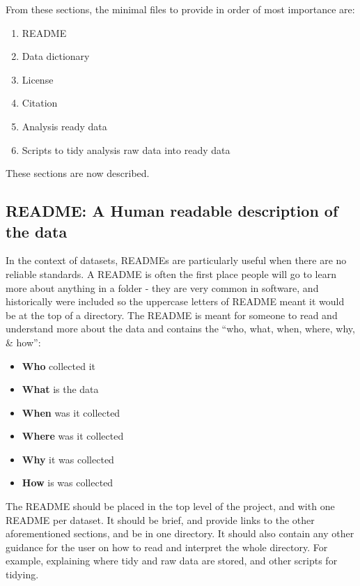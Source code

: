 \documentclass[
]{article}
\providecommand{\tightlist}{%
  \setlength{\itemsep}{0pt}\setlength{\parskip}{0pt}}
\begin{document}
From these sections, the minimal files to provide in order of most importance are:

\begin{enumerate}
\def\labelenumi{\arabic{enumi}.}
\tightlist
\item
  README
\item
  Data dictionary
\item
  License
\item
  Citation
\item
  Analysis ready data
\item
  Scripts to tidy analysis raw data into ready data
\end{enumerate}

These sections are now described.

\hypertarget{readme}{%
\subsection{README: A Human readable description of the data}\label{readme}}

In the context of datasets, READMEs are particularly useful when there are no reliable standards. A README is often the first place people will go to learn more about anything in a folder - they are very common in software, and historically were included so the uppercase letters of README meant it would be at the top of a directory. The README is meant for someone to read and understand more about the data and contains the ``who, what, when, where, why, \& how'':

\begin{itemize}
\tightlist
\item
  \textbf{Who} collected it
\item
  \textbf{What} is the data
\item
  \textbf{When} was it collected
\item
  \textbf{Where} was it collected
\item
  \textbf{Why} it was collected
\item
  \textbf{How} is was collected
\end{itemize}

The README should be placed in the top level of the project, and with one README per dataset. It should be brief, and provide links to the other aforementioned sections, and be in one directory. It should also contain any other guidance for the user on how to read and interpret the whole directory. For example, explaining where tidy and raw data are stored, and other scripts for tidying.
\end{document}
